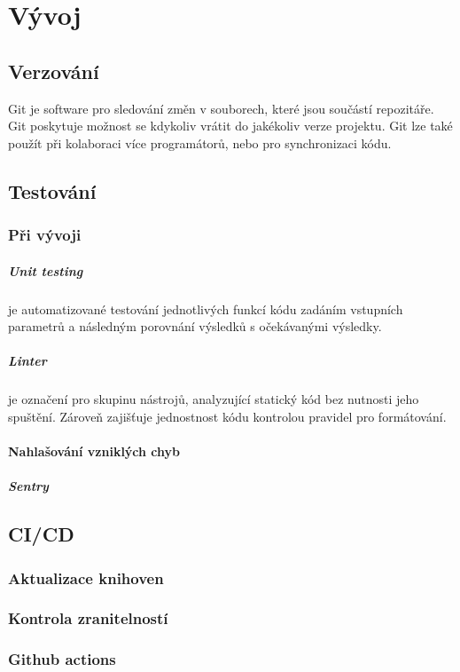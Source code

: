 \documentclass[12pt, a4paper,
 twoside,        %
 openright
]{report}
\begin{document}
\chapter{Vývoj}
\section{Verzování}
Git je software pro sledování změn v souborech, které jsou součástí repozitáře. Git poskytuje možnost se kdykoliv vrátit do jakékoliv verze projektu. Git lze také použít při kolaboraci více programátorů, nebo pro synchronizaci kódu.
\section{Testování}
\subsection{Při vývoji}  
\paragraph{Unit testing} je automatizované testování jednotlivých funkcí kódu zadáním vstupních parametrů a následným porovnání výsledků s očekávanými výsledky.
\paragraph{Linter} je označení pro skupinu nástrojů, analyzující statický kód bez nutnosti jeho spuštění. Zároveň zajišťuje jednostnost kódu kontrolou pravidel pro formátování. 
\subsubsection{Nahlašování vzniklých chyb}
\paragraph{Sentry}


 

\section{CI/CD}
\subsection{Aktualizace knihoven}
\subsection{Kontrola zranitelností}
\subsection{Github actions} 


 
\end{document}
